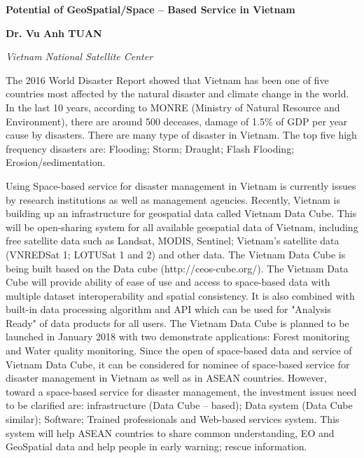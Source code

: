 	\begin{center}
	{\large \bfseries Potential of GeoSpatial/Space -- Based Service in Vietnam\par}
	\vspace{0.5 cm}
	{\bfseries Dr. Vu Anh TUAN\par}
	{\itshape Vietnam National Satellite Center\par}
	\end{center}
	{\tab The 2016 World Disaster Report showed that Vietnam has been one of five countries most affected by the natural disaster and climate change in the world. In the last 10 years, according to MONRE (Ministry of Natural Resource and Environment), there are around 500 deceases, damage of 1.5\% of GDP per year cause by disasters. There are many type of disaster in Vietnam.  The top five high frequency disasters are: Flooding; Storm; Draught; Flash Flooding; Erosion/sedimentation.
	
	
Using Space-based service for disaster management in Vietnam is currently issues by research institutions as well as management agencies. Recently, Vietnam is building up an infrastructure for geospatial data called Vietnam Data Cube. This will be open-sharing system for all available geospatial data of Vietnam, including free satellite data such as Landsat, MODIS, Sentinel; Vietnam's satellite data (VNREDSat 1; LOTUSat 1 and 2) and other data. The Vietnam Data Cube is being built based on the Data cube (http://ceos-cube.org/). The Vietnam Data Cube will provide ability of ease of use and access to space-based data with multiple dataset interoperability and spatial consistency. It is also combined with built-in data processing algorithm and API which can be used for "Analysis Ready" of data products for all users. The Vietnam Data Cube is planned to be launched in January 2018 with two demonstrate applications: Forest monitoring and Water quality monitoring. Since the open of space-based data and service of Vietnam Data Cube, it can be considered for nominee of space-based service for disaster management in Vietnam as well as in ASEAN countries. However, toward a space-based service for disaster management, the investment issues need to be clarified are: infrastructure (Data Cube – based); Data system (Data Cube similar); Software; Trained professionals and Web-based services system. This system will help ASEAN countries to share common understanding, EO and GeoSpatial data and help people in early warning; rescue information.
\par}
